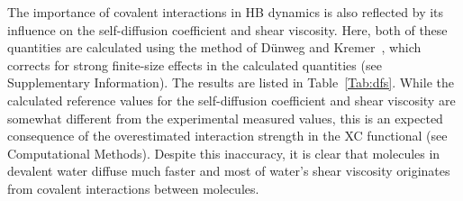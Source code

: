 \documentclass[10pt,amsmath,twocolumn,aps,prl,superscriptaddress,floatfix]{revtex4-1}
\newcommand{\Ang}{\ensuremath{\mathring{\text{A}}}}
\newcommand{\old}{\color{black}}
\begin{document}

The importance of covalent interactions in HB dynamics is also reflected by its influence on the self-diffusion coefficient and shear viscosity. 
Here, both of these quantities are calculated using the method of D\"unweg and Kremer~\cite{dunweg1993molecular}, which corrects for strong finite-size effects in the calculated quantities (see Supplementary Information). The results are listed in Table~\ref{Tab:dfs}. 
While the calculated reference values for the self-diffusion coefficient and shear viscosity are somewhat different from the experimental measured values, this is an expected consequence of the overestimated interaction strength in the XC functional (see Computational Methods). 
Despite this inaccuracy, it is clear that molecules in devalent water diffuse much faster and most of water's shear viscosity originates from covalent interactions between molecules.

\end{document}
